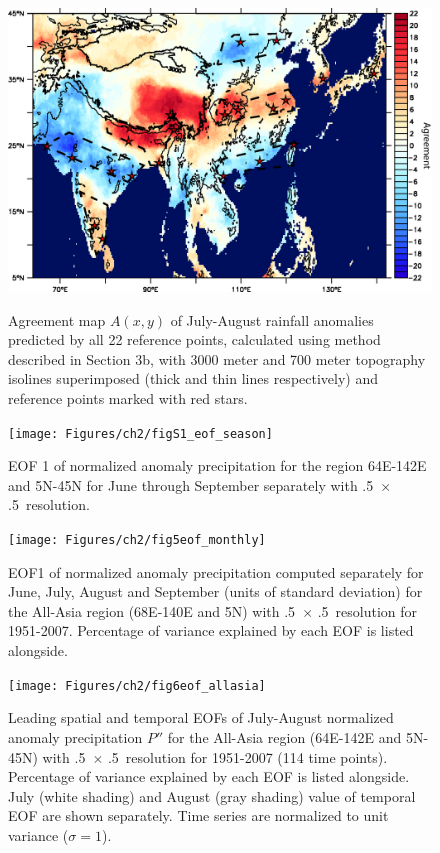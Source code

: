 \begin{figure}[t]
  \noindent\includegraphics[width=36pc,angle=0]{Figures/ch2/fig4agreement}\\
  \caption{Agreement map $A(x,y)$ of July-August rainfall anomalies predicted by all 22 reference points, calculated using method described in Section 3b, with 3000 meter and 700 meter topography isolines superimposed (thick and thin lines respectively) and reference points marked with red stars.}
  \label{fig:f24}
\end{figure}

\begin{figure}[t]
  \noindent\texttt{[image: Figures/ch2/figS1\_eof\_season]}\\
  \caption{EOF 1 of normalized anomaly precipitation for the region 64E-142E and 5N-45N for June through September separately with .5\textdegree\ $\times$ .5\textdegree\ resolution.}
  \label{fig:S21}
\end{figure}

\begin{figure}[t]
  \noindent\texttt{[image: Figures/ch2/fig5eof\_monthly]}\\
  \caption{EOF1 of normalized anomaly precipitation computed separately for June, July, August and September (units of standard deviation) for the All-Asia region (68\textdegree E-140\textdegree E and 5\textdegree N) with .5\textdegree\ $\times$ .5\textdegree\ resolution for 1951-2007. Percentage of variance explained by each EOF is listed alongside.}
  \label{fig:f25}
\end{figure}

\begin{figure}[t]
  \noindent\texttt{[image: Figures/ch2/fig6eof\_allasia]}\\
  \caption{Leading spatial and temporal EOFs of July-August normalized anomaly precipitation $P''$ for the All-Asia region (64\textdegree E-142\textdegree E and 5\textdegree N-45\textdegree N) with .5\textdegree\ $\times$ .5\textdegree\ resolution for 1951-2007 (114 time points). Percentage of variance explained by each EOF is listed alongside. July (white shading) and August (gray shading) value of temporal EOF are shown separately. Time series are normalized to unit variance ($\sigma=1$).}
  \label{fig:f26}
\end{figure}

